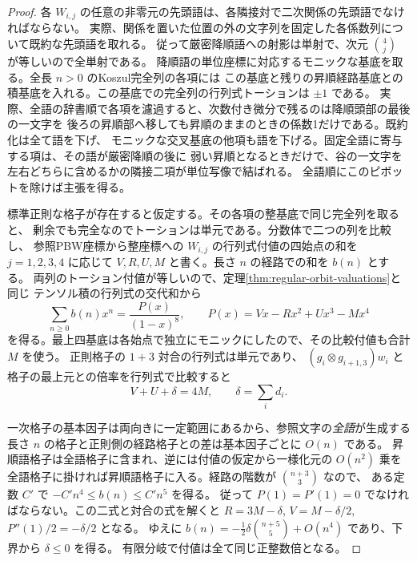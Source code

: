 \begin{proof}
各 $W_{i,j}$ の任意の非零元の先頭語は、各隣接対で二次関係の先頭語でなければならない。
実際、関係を置いた位置の外の文字列を固定した各係数列について既約な先頭語を取れる。
従って厳密降順語への射影は単射で、次元 $\binom4j$ が等しいので全単射である。
降順語の単位座標に対応するモニックな基底を取る。全長 $n>0$ のKoszul完全列の各項には
この基底と残りの昇順経路基底との積基底を入れる。この基底での完全列の行列式トーションは $\pm1$ である。
実際、全語の辞書順で各項を濾過すると、次数付き微分で残るのは降順頭部の最後の一文字を
後ろの昇順部へ移しても昇順のままのときの係数1だけである。既約化は全て語を下げ、
モニックな交叉基底の他項も語を下げる。固定全語に寄与する項は、その語が厳密降順の後に
弱い昇順となるときだけで、谷の一文字を左右どちらに含めるかの隣接二項が単位写像で結ばれる。
全語順にこのピボットを除けば主張を得る。

標準正則な格子が存在すると仮定する。その各項の整基底で同じ完全列を取ると、
剰余でも完全なのでトーションは単元である。分数体で二つの列を比較し、
参照PBW座標から整座標への $W_{i,j}$ の行列式付値の四始点の和を
$j=1,2,3,4$ に応じて $V,R,U,M$ と書く。長さ $n$ の経路での和を $b(n)$ とする。
両列のトーション付値が等しいので、定理\ref{thm:regular-orbit-valuations}と同じ
テンソル積の行列式の交代和から
\[
       \sum_{n\ge0} b(n)x^n =
       \frac{P(x)}{(1-x)^8},\qquad P(x)=Vx-Rx^2+Ux^3-Mx^4
\]
を得る。最上四基底は各始点で独立にモニックにしたので、その比較付値も合計 $M$ を使う。
正則格子の $1+3$ 対合の行列式は単元であり、
$(g_i\otimes g_{i+1,3})w_i$ と格子の最上元との倍率を行列式で比較すると
\[
                    V+U+\delta=4M,\qquad\delta=\sum_i d_i .
\]

一次格子の基本因子は両向きに一定範囲にあるから、参照文字の\emph{全語}が生成する
長さ $n$ の格子と正則側の経路格子との差は基本因子ごとに $O(n)$ である。
昇順語格子は全語格子に含まれ、逆には付値の仮定から一様化元の $O(n^2)$ 乗を
全語格子に掛ければ昇順語格子に入る。経路の階数が $\binom{n+3}3$ なので、
ある定数 $C'$ で $-C'n^4\le b(n)\le C'n^5$ を得る。
従って $P(1)=P'(1)=0$ でなければならない。この二式と対合の式を解くと
$R=3M-\delta$, $V=M-\delta/2$, $P''(1)/2=-\delta/2$ となる。
ゆえに $b(n)=-\tfrac12\delta\binom{n+5}{5}+O(n^4)$ であり、下界から $\delta\le0$ を得る。
有限分岐で付値は全て同じ正整数倍となる。
\end{proof}

